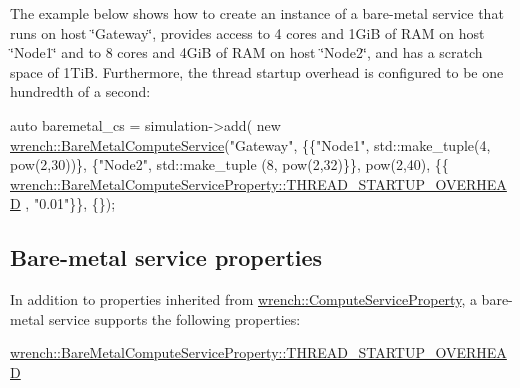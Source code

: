 The example below shows how to create an instance of a bare-\/metal service that runs on host \char`\"{}\+Gateway\char`\"{}, provides access to 4 cores and 1\+GiB of R\+AM on host \char`\"{}\+Node1\char`\"{} and to 8 cores and 4\+GiB of R\+AM on host \char`\"{}\+Node2\char`\"{}, and has a scratch space of 1\+TiB. Furthermore, the thread startup overhead is configured to be one hundredth of a second\+:


\begin{DoxyCode}
\textcolor{keyword}{auto} baremetal\_cs = simulation->add(
          \textcolor{keyword}{new} \hyperlink{classwrench_1_1_bare_metal_compute_service}{wrench::BareMetalComputeService}(\textcolor{stringliteral}{"Gateway"}, 
                                       \{\{\textcolor{stringliteral}{"Node1"}, std::make\_tuple(4, pow(2,30))\}, \{\textcolor{stringliteral}{"Node2"}, std::make\_tuple
      (8, pow(2,32)\}\},
                                       pow(2,40),
                                       \{\{
      \hyperlink{classwrench_1_1_bare_metal_compute_service_property_a63dfaa7ebb4dc18d236c58384f14dd25}{wrench::BareMetalComputeServiceProperty::THREAD\_STARTUP\_OVERHEAD}
      , \textcolor{stringliteral}{"0.01"}\}\}, 
                                       \{\});
\end{DoxyCode}
\hypertarget{guide-batch_guide-baremetal-creating-properties}{}\subsection{Bare-\/metal service properties}\label{guide-batch_guide-baremetal-creating-properties}
In addition to properties inherited from {\ttfamily \hyperlink{classwrench_1_1_compute_service_property}{wrench\+::\+Compute\+Service\+Property}}, a bare-\/metal service supports the following properties\+:


\begin{DoxyItemize}
\item {\ttfamily \hyperlink{classwrench_1_1_bare_metal_compute_service_property_a63dfaa7ebb4dc18d236c58384f14dd25}{wrench\+::\+Bare\+Metal\+Compute\+Service\+Property\+::\+T\+H\+R\+E\+A\+D\+\_\+\+S\+T\+A\+R\+T\+U\+P\+\_\+\+O\+V\+E\+R\+H\+E\+AD}} 
\end{DoxyItemize}